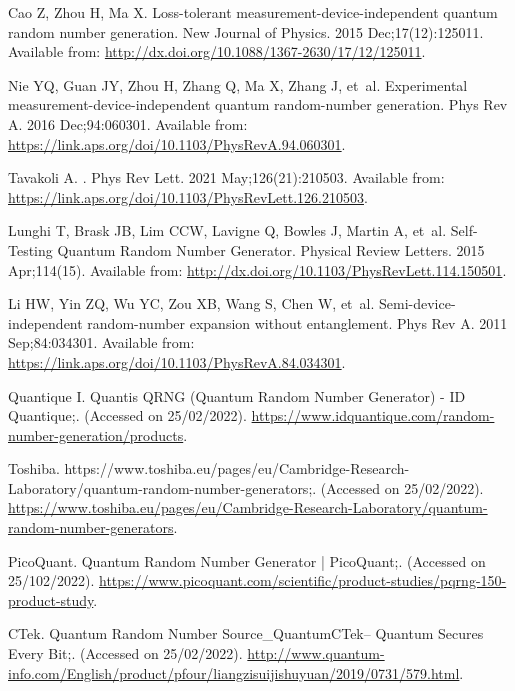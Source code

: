 \documentclass[]{interact}
\theoremstyle{plain}%
\theoremstyle{definition}
\theoremstyle{remark}
\begin{document}
\begin{thebibliography}{100}
Cao Z, Zhou H, Ma X.
\newblock Loss-tolerant measurement-device-independent quantum random number
  generation.
\newblock New Journal of Physics. 2015 Dec;17(12):125011.
\newblock Available from:
  \url{http://dx.doi.org/10.1088/1367-2630/17/12/125011}.

Nie YQ, Guan JY, Zhou H, Zhang Q, Ma X, Zhang J, et~al.
\newblock Experimental measurement-device-independent quantum random-number
  generation.
\newblock Phys Rev A. 2016 Dec;94:060301.
\newblock Available from:
  \url{https://link.aps.org/doi/10.1103/PhysRevA.94.060301}.

Tavakoli A.
.
\newblock Phys Rev Lett. 2021 May;126(21):210503.
\newblock Available from:
  \url{https://link.aps.org/doi/10.1103/PhysRevLett.126.210503}.

Lunghi T, Brask JB, Lim CCW, Lavigne Q, Bowles J, Martin A, et~al.
\newblock Self-Testing Quantum Random Number Generator.
\newblock Physical Review Letters. 2015 Apr;114(15).
\newblock Available from:
  \url{http://dx.doi.org/10.1103/PhysRevLett.114.150501}.

Li HW, Yin ZQ, Wu YC, Zou XB, Wang S, Chen W, et~al.
\newblock Semi-device-independent random-number expansion without entanglement.
\newblock Phys Rev A. 2011 Sep;84:034301.
\newblock Available from:
  \url{https://link.aps.org/doi/10.1103/PhysRevA.84.034301}.

Quantique I. Quantis QRNG (Quantum Random Number Generator) - ID Quantique;.
\newblock (Accessed on 25/02/2022).
\newblock \url{https://www.idquantique.com/random-number-generation/products}.

Toshiba.
  https://www.toshiba.eu/pages/eu/Cambridge-Research-Laboratory/quantum-random-number-generators;.
\newblock (Accessed on 25/02/2022).
\newblock
  \url{https://www.toshiba.eu/pages/eu/Cambridge-Research-Laboratory/quantum-random-number-generators}.

PicoQuant. Quantum Random Number Generator | PicoQuant;.
\newblock (Accessed on 25/102/2022).
\newblock
  \url{https://www.picoquant.com/scientific/product-studies/pqrng-150-product-study}.

CTek. Quantum Random Number Source\_QuantumCTek– Quantum Secures Every Bit;.
\newblock (Accessed on 25/02/2022).
\newblock
  \url{http://www.quantum-info.com/English/product/pfour/liangzisuijishuyuan/2019/0731/579.html}.


\end{thebibliography}
\end{document}
